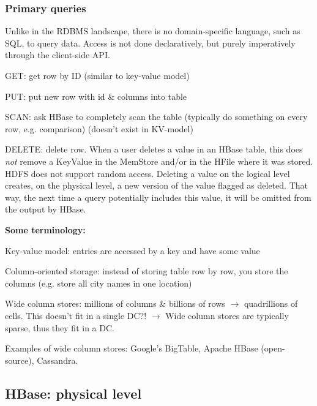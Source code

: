 \documentclass[11pt,oneside,a4paper]{article}
\begin{document}
\subsubsection{Primary queries}

Unlike in the RDBMS landscape, there is no domain-specific language, such as SQL, to query data. Access is not done declaratively, but purely imperatively through the client-side API.

\begin{compactitem}
	\item GET: get row by ID (similar to key-value model)
	\item PUT: put new row with id \& columns into table
	\item SCAN: ask HBase to completely scan the table (typically do something on every row, e.g. comparison) (doesn't exist in KV-model)
	\item DELETE: delete row. When a user deletes a value in an HBase table, this does \textit{not} remove a KeyValue in the MemStore and/or in the HFile where it was stored. HDFS does not support random access. Deleting a value on the logical level creates, on the physical level, a new version of the value flagged as deleted. That way, the next time a query potentially includes this value, it will be omitted from the output by HBase.
\end{compactitem}

\textbf{Some terminology:}

\begin{compactitem}
	\item Key-value model: entries are accessed by a key and have some value
	\item Column-oriented storage: instead of storing table row by row, you store the columns (e.g. store all city names in one location)
	\item Wide column stores: millions of columns \& billions of rows $\rightarrow$ quadrillions of cells. This doesn't fit in a single DC?! $\rightarrow$ Wide column stores are typically sparse, thus they fit in a DC.
\end{compactitem}

Examples of wide column stores: Google's BigTable, Apache HBase (open-source), Cassandra.\\

\subsection{HBase: physical level}
\end{document}
